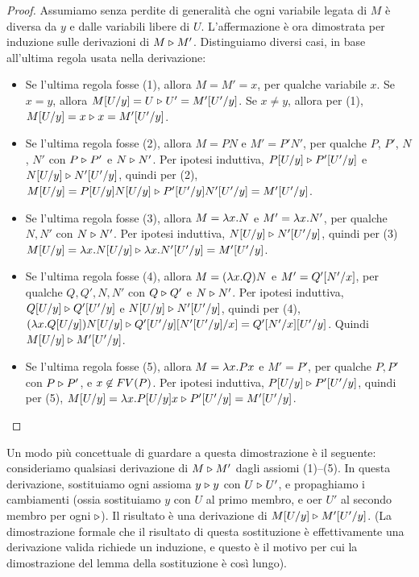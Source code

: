 \documentclass{article}
\begin{document}
\begin{proof}
  Assumiamo senza perdite di generalit\`a che ogni variabile legata di $M$
  \`e diversa da $y$ e dalle variabili libere di $U$. L'affermazione
  \`e ora dimostrata per induzione sulle derivazioni di $M\mathrel{\triangleright} M'$. Distinguiamo
  diversi casi, in base all'ultima regola usata
  nella derivazione:
  \begin{itemize}
  \item Se l'ultima regola fosse (1), allora $M=M'=x$, per qualche variabile
    $x$. Se $x=y$, allora $M[U/y]=U\mathrel{\triangleright} U'=M'[U'/y]$.
    Se $x\neq y$, allora per (1), $M[U/y]=x\mathrel{\triangleright}
    x=M'[U'/y]$.
  \item Se l'ultima regola fosse (2), allora $M=PN$ e $M'=P'N'$, per qualche
    $P$, $P'$, $N$, $N'$ con $P\mathrel{\triangleright} P'$ e $N\mathrel{\triangleright} N'$. Per ipotesi
    induttiva, $P[U/y]\mathrel{\triangleright} P'[U'/y]$ e
    $N[U/y]\mathrel{\triangleright} N'[U'/y]$, quindi per (2),
    $M[U/y]=P[U/y]N[U/y] \mathrel{\triangleright} 
    P'[U'/y]N'[U'/y] = M'[U'/y]$.
  \item Se l'ultima regola fosse (3), allora $M=\lambda x.N$ e $M'=\lambda
    x.N'$, per qualche $N,N'$ con $N\mathrel{\triangleright} N'$. Per ipotesi induttiva,
    $N[U/y]\mathrel{\triangleright} N'[U'/y]$, quindi per (3)
    $M[U/y]=\lambda x.N[U/y] \mathrel{\triangleright} \lambda
    x.N'[U'/y] = M'[U'/y]$.
  \item Se l'ultima regola fosse (4), allora $M=(\lambda x.Q)N$ e
    $M'=Q'[N'/x]$, per qualche $Q,Q',N,N'$ con $Q\mathrel{\triangleright} Q'$ e
    $N\mathrel{\triangleright} N'$.  Per ipotesi induttiva, $Q[U/y]\mathrel{\triangleright}
    Q'[U'/y]$ e $N[U/y]\mathrel{\triangleright} N'[U'/y]$,
    quindi per (4), $(\lambda x.Q[U/y])N[U/y] \mathrel{\triangleright}
    Q'[U'/y][N'[U'/y]/x] =
    Q'[N'/x][U'/y]$. Quindi $M[U/y]
    \mathrel{\triangleright} M'[U'/y]$.
  \item Se l'ultima regola fosse (5), allora $M=\lambda x.Px$ e $M'=P'$, per
    qualche $P,P'$ con $P\mathrel{\triangleright} P'$, e $x\not\in FV(P)$. Per ipotesi
    induttiva, $P[U/y]\mathrel{\triangleright} P'[U'/y]$, quindi per (5),
    $M[U/y]=\lambda x.P[U/y]x \mathrel{\triangleright}
    P'[U'/y]=M'[U'/y]$.\eot
  \end{itemize}
\end{proof}
  
Un modo pi\`u concettuale di guardare a questa dimostrazione \`e il seguente:
consideriamo qualsiasi derivazione di $M\mathrel{\triangleright} M'$ dagli assiomi (1)--(5). In
questa derivazione, sostituiamo ogni assioma
 $y\mathrel{\triangleright} y$ con $U\mathrel{\triangleright} U'$, e propaghiamo i
cambiamenti (ossia sostituiamo $y$ con $U$ al primo membro, e oer
$U'$ al secondo membro per ogni $\mathrel{\triangleright}$). Il risultato \`e una derivazione
di $M[U/y]\mathrel{\triangleright}M'[U'/y]$. (La dimostrazione formale che
il risultato di questa sostituzione \`e effettivamente una derivazione valida richiede
un induzione, e questo \`e il motivo per cui la dimostrazione del lemma
della sostituzione \`e cos\`i lungo).
\end{document}
